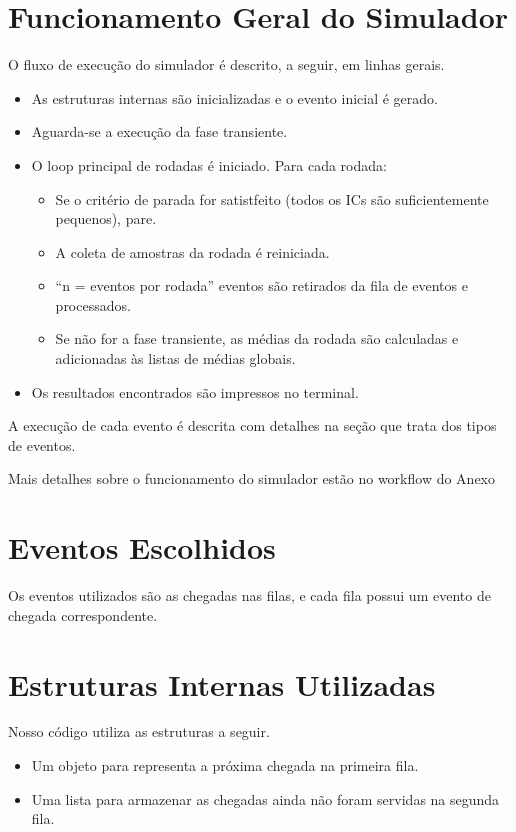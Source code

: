\documentclass[a4paper,12pt]{report}
\begin{document}
\section{Funcionamento Geral do Simulador}
O fluxo de execução do simulador é descrito, a seguir, em linhas gerais.
\begin{itemize}
  \item As estruturas internas são inicializadas e o evento inicial é gerado.
  \item Aguarda-se a execução da fase transiente.
  \item O loop principal de rodadas é iniciado. Para cada rodada:
  \begin{itemize}
    \item Se o critério de parada for satistfeito (todos os ICs são suficientemente pequenos), pare.
    \item A coleta de amostras da rodada é reiniciada.
    \item “n = eventos por rodada” eventos são retirados da fila de eventos e processados.
    \item Se não for a fase transiente, as médias da rodada são calculadas e adicionadas às listas de médias globais.
\end{itemize}
  \item Os resultados encontrados são impressos no terminal.
\end{itemize}

A execução de cada evento é descrita com detalhes na seção que trata dos tipos de eventos.

Mais detalhes sobre o funcionamento do simulador estão no workflow do Anexo %

\section{Eventos Escolhidos}
Os eventos utilizados são as chegadas nas filas, e cada fila possui um evento de chegada correspondente.

\section{Estruturas Internas Utilizadas}
Nosso código utiliza as estruturas a seguir.
\begin{itemize}
  \item Um objeto para representa a próxima chegada na primeira fila.
  \item Uma lista para armazenar as chegadas ainda não foram servidas na segunda fila.
\end{itemize}
\end{document}
